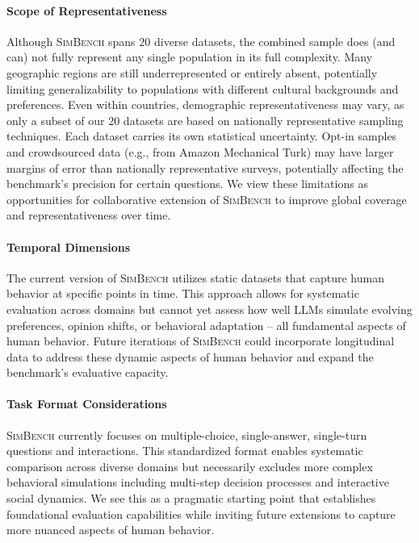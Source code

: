 \documentclass{article} %
\begin{document}
\paragraph{Scope of Representativeness} Although \textsc{SimBench} spans 20 diverse datasets, the combined sample does (and can) not fully represent any single population in its full complexity. Many geographic regions are still underrepresented or entirely absent, potentially limiting generalizability to populations with different cultural backgrounds and preferences. Even within countries, demographic representativeness may vary, as only a subset of our 20 datasets are based on nationally representative sampling techniques. Each dataset carries its own statistical uncertainty. Opt-in samples and crowdsourced data (e.g., from Amazon Mechanical Turk) may have larger margins of error than nationally representative surveys, potentially affecting the benchmark's precision for certain questions. We view these limitations as opportunities for collaborative extension of \textsc{SimBench} to improve global coverage and representativeness over time.

\paragraph{Temporal Dimensions} The current version of \textsc{SimBench} utilizes static datasets that capture human behavior at specific points in time. This approach allows for systematic evaluation across domains but cannot yet assess how well LLMs simulate evolving preferences, opinion shifts, or behavioral adaptation -- all fundamental aspects of human behavior. Future iterations of \textsc{SimBench} could incorporate longitudinal data to address these dynamic aspects of human behavior and expand the benchmark's evaluative capacity.

\paragraph{Task Format Considerations} \textsc{SimBench} currently focuses on multiple-choice, single-answer, single-turn questions and interactions. This standardized format enables systematic comparison across diverse domains but necessarily excludes more complex behavioral simulations including multi-step decision processes and interactive social dynamics. We see this as a pragmatic starting point that establishes foundational evaluation capabilities while inviting future extensions to capture more nuanced aspects of human behavior.
\end{document}
